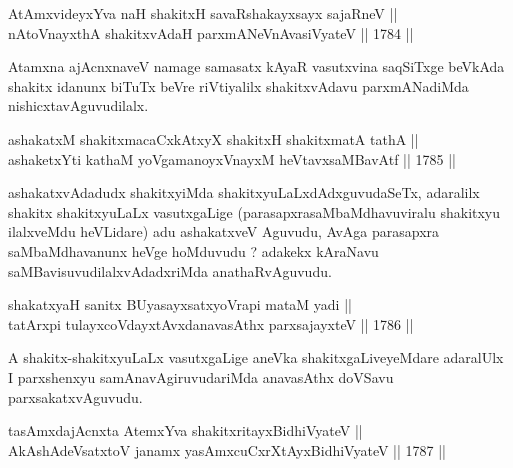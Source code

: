 

\begin{shl}
AtAmxvideyxYva naH shakitxH savaRshakayxsayx sajaRneV || \\
nAtoV\s nayxthA shakitxvAdaH parxmANeVnAvasiVyateV ||  1784 ||  
\end{shl}

\begin{artha}
Atamxna ajAcnxnaveV namage samasatx kAyaR vasutxvina saqSiTxge beVkAda
shakitx idanunx biTuTx beVre riVtiyalilx shakitxvAdavu parxmANadiMda
nishicxtavAguvudilalx.
\end{artha}


\begin{shl}
ashakatxM shakitxmacaCxkAtxyX shakitxH shakitxmatA tathA || \\
ashaketxYti kathaM yoVgamanoyxVnayxM heVtavxsaMBavAtf ||  1785 ||  
\end{shl}

\begin{artha}
ashakatxvAdadudx shakitxyiMda shakitxyuLaLxdAdxguvudaSeTx, adaralilx
shakitx shakitxyuLaLx vasutxgaLige (parasapxrasaMbaMdhavuviralu
shakitxyu ilalxveMdu heVLidare) adu ashakatxveV Aguvudu, AvAga
parasapxra saMbaMdhavanunx heVge hoMduvudu ? adakekx kAraNavu
saMBavisuvudilalxvAdadxriMda anathaRvAguvudu.
\end{artha}


\begin{shl}
shakatxyaH sanitx BUyasayxsatxyoVrapi mataM yadi || \\
tatArxpi tulayxcoVdayxtAvxdanavasAthx parxsajayxteV ||  1786 || 
\end{shl}

\begin{artha}
A shakitx-shakitxyuLaLx vasutxgaLige aneVka shakitxgaLiveyeMdare
adaralUlx I parxshenxyu samAnavAgiruvudariMda anavasAthx doVSavu
parxsakatxvAguvudu.
\end{artha}


\begin{shl}
tasAmxdajAcnxta AtemxYva shakitxritayxBidhiVyateV || \\
AkAshAdeVsatxtoV janamx yasAmxcuCxrXtAyx\s BidhiVyateV ||  1787 ||  
\end{shl}

